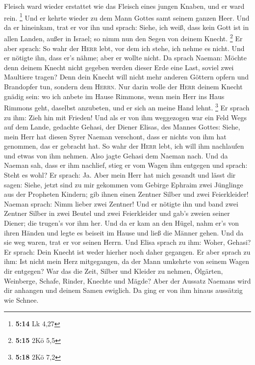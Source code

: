 Fleisch ward wieder erstattet wie das Fleisch eines jungen Knaben, und
er ward rein. \footnote{\textbf{5:14} Lk 4,27}  Und er
kehrte wieder zu dem Mann Gottes samt seinem ganzen Heer. Und da er
hineinkam, trat er vor ihn und sprach: Siehe, ich weiß, dass kein Gott
ist in allen Landen, außer in Israel; so nimm nun den Segen von deinem
Knecht. \footnote{\textbf{5:15} 2Kö 5,5}  Er aber sprach:
So wahr der \textsc{Herr} lebt, vor dem ich stehe, ich nehme es nicht.
Und er nötigte ihn, dass er's nähme; aber er wollte nicht.
 Da sprach Naeman: Möchte denn deinem Knecht nicht
gegeben werden dieser Erde eine Last, soviel zwei Maultiere tragen? Denn
dein Knecht will nicht mehr anderen Göttern opfern und Brandopfer tun,
sondern dem \textsc{Herrn}.  Nur darin wolle der
\textsc{Herr} deinem Knecht gnädig sein: wo ich anbete im Hause Rimmons,
wenn mein Herr ins Haus Rimmons geht, daselbst anzubeten, und er sich an
meine Hand lehnt. \footnote{\textbf{5:18} 2Kö 7,2}  Er
sprach zu ihm: Zieh hin mit Frieden! Und als er von ihm weggezogen war
ein Feld Wegs auf dem Lande,  gedachte Gehasi, der Diener
Elisas, des Mannes Gottes: Siehe, mein Herr hat diesen Syrer Naeman
verschont, dass er nichts von ihm hat genommen, das er gebracht hat. So
wahr der \textsc{Herr} lebt, ich will ihm nachlaufen und etwas von ihm
nehmen.  Also jagte Gehasi dem Naeman nach. Und da Naeman
sah, dass er ihm nachlief, stieg er vom Wagen ihm entgegen und sprach:
Steht es wohl?  Er sprach: Ja. Aber mein Herr hat mich
gesandt und lässt dir sagen: Siehe, jetzt sind zu mir gekommen vom
Gebirge Ephraim zwei Jünglinge aus der Propheten Kindern; gib ihnen
einen Zentner Silber und zwei Feierkleider!  Naeman
sprach: Nimm lieber zwei Zentner! Und er nötigte ihn und band zwei
Zentner Silber in zwei Beutel und zwei Feierkleider und gab's zweien
seiner Diener; die trugen's vor ihm her.  Und da er kam
an den Hügel, nahm er's von ihren Händen und legte es beiseit im Hause
und ließ die Männer gehen.  Und da sie weg waren, trat er
vor seinen Herrn. Und Elisa sprach zu ihm: Woher, Gehasi? Er sprach:
Dein Knecht ist weder hierher noch daher gegangen.  Er
aber sprach zu ihm: Ist nicht mein Herz mitgegangen, da der Mann
umkehrte von seinem Wagen dir entgegen? War das die Zeit, Silber und
Kleider zu nehmen, Ölgärten, Weinberge, Schafe, Rinder, Knechte und
Mägde?  Aber der Aussatz Naemans wird dir anhangen und
deinem Samen ewiglich. Da ging er von ihm hinaus aussätzig wie Schnee.
